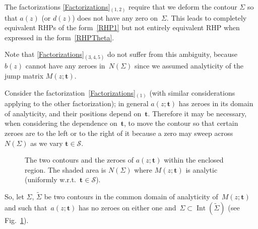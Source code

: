 \documentclass[pdftex]{sigma}
\numberwithin{equation}{section}
\def\wt{\widetilde}
\def \t{\mathbf t}
\begin{document}
The factorizations \eqref{Factorizations}$_{(1,2)}$ require that we deform the contour $\Sigma$ so that $a(z)$ (or $d(z)$) does not have any zero on~$\Sigma$. This leads to completely equivalent RHPs of the form~\eqref{RHP1} but not entirely equivalent RHP when expressed in the form~\eqref{RHPTheta}.

Note that \eqref{Factorizations}$_{(3,4,5)}$ do not suf\/fer from this ambiguity, because~$b(z)$ cannot have any zeroes in~$N(\Sigma)$ since we assumed analyticity of the jump matrix $M(z;\t)$.

Consider the factorization~\eqref{Factorizations}$_{(1)}$ (with similar considerations applying to the other factorization); in general $a(z;\t)$ has zeroes in its domain of analyticity, and their positions depend on~$\t$. Therefore it may be necessary, when considering the dependence on~$\t$, to move the contour so that certain zeroes are to the left or to the right of it because a zero may sweep across~$N(\Sigma)$ as we vary $\t\in \mathcal S$.

\begin{figure}[t]\centering
{}
\caption{The two contours and the zeroes of $a(z;\t)$ within the enclosed region. The shaded area is $N(\Sigma)$ where $M(z;\t)$ is analytic (uniformly w.r.t.~$\t\in \mathcal S$).}\label{ff1}
\end{figure}

So, let $\Sigma$, $\wt \Sigma$ be two contours in the common domain of analyticity of~$M(z;\t)$ and such that~$a(z;\t)$ has no zeroes on either one and~$\Sigma \subset \operatorname{Int}(\wt \Sigma)$ (see Fig.~\ref{ff1}).
\end{document}
